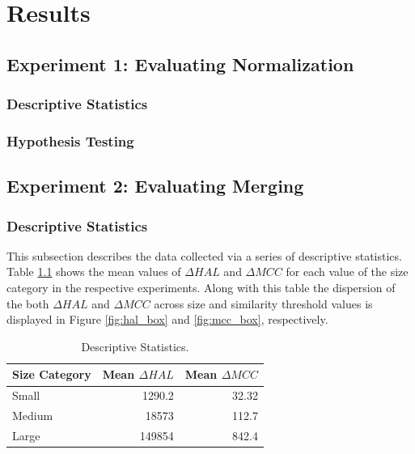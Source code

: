 \documentclass[10pt,nocc]{xrese_report}
\begin{document}
\chapter{Results}

\section{Experiment 1: Evaluating Normalization}

\subsection{Descriptive Statistics}

\subsection{Hypothesis Testing}

\section{Experiment 2: Evaluating Merging}

\subsection{Descriptive Statistics}

This subsection describes the data collected via a series of descriptive statistics. Table \ref{tbl:descriptive} shows the mean values of $\Delta HAL$ and $\Delta MCC$ for each value of the size category in the respective experiments. Along with this table the dispersion of the both $\Delta HAL$ and $\Delta MCC$ across size and similarity threshold values is displayed in Figure \ref{fig:hal_box} and \ref{fig:mcc_box}, respectively.

\begin{table}[tb]
\centering
\caption{Descriptive Statistics.}
\label{tbl:descriptive}
\begin{tabular}{lrr}
\hline
\textbf{Size Category} & \textbf{Mean $\Delta HAL$} & \textbf{Mean $\Delta MCC$}\tabularnewline
\hline
Small & 1290.2 & 32.32\tabularnewline
Medium & 18573 & 112.7\tabularnewline
Large & 149854 & 842.4\tabularnewline
\hline
\end{tabular}
\end{table}
\end{document}
